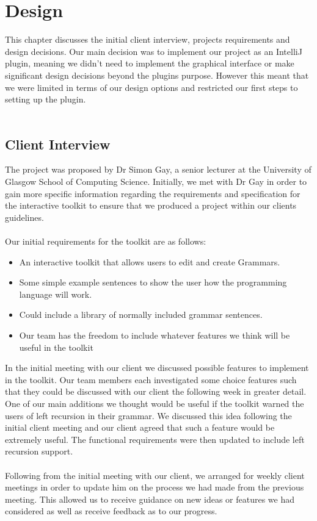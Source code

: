 \chapter{Design}
\label{design}
This chapter discusses the initial client interview, projects requirements and design decisions. Our main decision was to implement our project as an IntelliJ plugin, meaning we didn't need to implement the graphical interface or make significant design decisions beyond the plugins purpose.  However this meant that we were limited in terms of our design options and restricted our first steps to setting up the plugin.\\
\\
\section{Client Interview}
The project was proposed by Dr Simon Gay, a senior lecturer at the University of Glasgow School of Computing Science. Initially, we met with Dr Gay in order to gain more specific information regarding the requirements and specification for the interactive toolkit to ensure that we produced a project within our clients guidelines.\\
\\
Our initial requirements for the toolkit are as follows:
\begin{itemize}
	\item An interactive toolkit that allows users to edit and create Grammars.
	\item Some simple example sentences to show the user how the programming language will work.
	\item Could include a library of normally included grammar sentences.
	\item Our team has the freedom to include whatever features we think will be useful in the toolkit
\end{itemize}

In the initial meeting with our client we discussed possible features to implement in the toolkit. Our team members each investigated some choice features such that they could be discussed with our client the following week in greater detail. One of our main additions we thought would be useful if the toolkit warned the users of left recursion in their grammar. We discussed this idea following the initial client meeting and our client agreed that such a feature would be extremely useful. The functional requirements were then updated to include left recursion support.\\
\\
Following from the initial meeting with our client, we arranged for weekly client meetings in order to update him on the process we had made from the previous meeting. This allowed us to receive guidance on new ideas or features we had considered as well as receive feedback as to our progress. 

